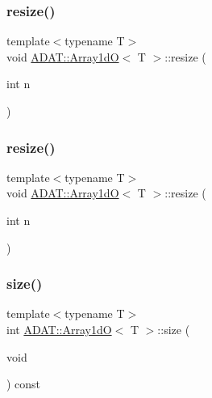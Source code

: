 \subsubsection{\texorpdfstring{resize()}{resize()}\hspace{0.1cm}{\footnotesize\ttfamily [2/3]}}
{\footnotesize\ttfamily template$<$typename T$>$ \\
void \mbox{\hyperlink{classADAT_1_1Array1dO}{A\+D\+A\+T\+::\+Array1dO}}$<$ T $>$\+::resize (\begin{DoxyParamCaption}\item[{int}]{n }\end{DoxyParamCaption})\hspace{0.3cm}{\ttfamily [inline]}}

\mbox{\label{classADAT_1_1Array1dO_afc98b7076e43428faae90d7cb1dab3bf}} 
\subsubsection{\texorpdfstring{resize()}{resize()}\hspace{0.1cm}{\footnotesize\ttfamily [3/3]}}
{\footnotesize\ttfamily template$<$typename T$>$ \\
void \mbox{\hyperlink{classADAT_1_1Array1dO}{A\+D\+A\+T\+::\+Array1dO}}$<$ T $>$\+::resize (\begin{DoxyParamCaption}\item[{int}]{n }\end{DoxyParamCaption})\hspace{0.3cm}{\ttfamily [inline]}}

\mbox{\label{classADAT_1_1Array1dO_a749307d8e42867d6fac39dc9aca84978}} 
\subsubsection{\texorpdfstring{size()}{size()}\hspace{0.1cm}{\footnotesize\ttfamily [1/3]}}
{\footnotesize\ttfamily template$<$typename T$>$ \\
int \mbox{\hyperlink{classADAT_1_1Array1dO}{A\+D\+A\+T\+::\+Array1dO}}$<$ T $>$\+::size (\begin{DoxyParamCaption}\item[{void}]{ }\end{DoxyParamCaption}) const\hspace{0.3cm}{\ttfamily [inline]}}

